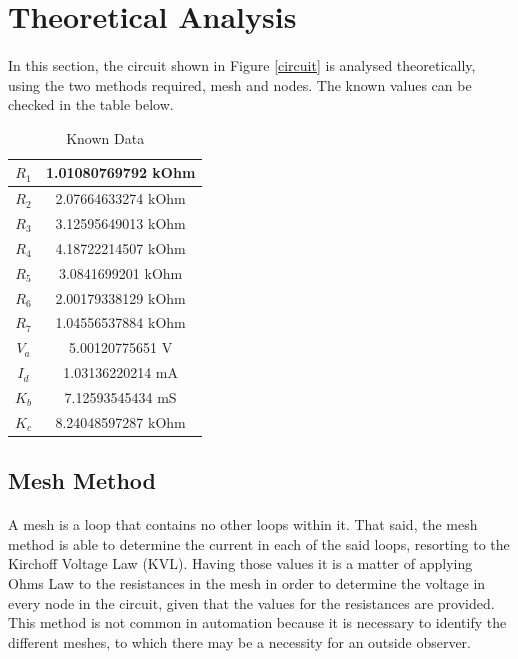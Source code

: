 \section{Theoretical Analysis}
\label{sec:analysis}
\paragraph{}
\par In this section, the circuit shown in Figure \ref{circuit} is analysed
theoretically, using the two methods required, mesh and nodes. The known values can be checked in the table below.
\begin{table}[H]
    \centering
    \begin{tabular}{|c|c|}
    \hline
        $R_1$ & 1.01080769792 kOhm \\ \hline 
        $R_2$ & 2.07664633274 kOhm \\ \hline
        $R_3$ & 3.12595649013 kOhm \\ \hline
        $R_4$ & 4.18722214507 kOhm \\ \hline
        $R_5$ & 3.0841699201 kOhm  \\ \hline
        $R_6$ & 2.00179338129 kOhm \\ \hline
        $R_7$ & 1.04556537884 kOhm \\ \hline
        $V_a$ & 5.00120775651 V \\ \hline
        $I_d$ & 1.03136220214 mA \\ \hline
        $K_b$ & 7.12593545434 mS \\ \hline
        $K_c$ & 8.24048597287 kOhm \\ \hline	
    \end{tabular}
    \caption{Known Data}
    \label{data}
\end{table}
\subsection{Mesh Method}
\paragraph{}
\par A mesh is a loop that contains no other loops within it. That said, the mesh method is able to determine the current in each of the said loops, resorting to the Kirchoff Voltage Law (KVL). Having those values it is a matter of applying Ohms Law to the resistances in the mesh in order to determine the voltage in every node in the circuit, given that the values for the resistances are provided. This method is not common in automation because it is necessary to identify the different meshes, to which there may be a necessity for an outside observer.

